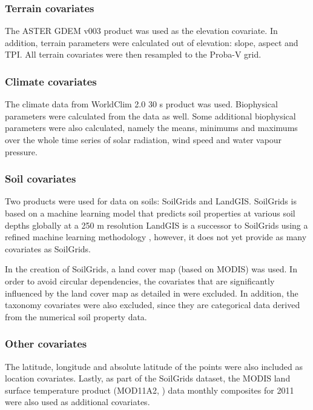 \documentclass[a4paper,10pt]{article}
\begin{document}
\subsubsection{Terrain covariates}

The ASTER GDEM v003 \citep{ASTGTM003} product was used as the elevation covariate.
In addition, terrain parameters were calculated out of elevation: slope, aspect and \ac{TPI}.
All terrain covariates were then resampled to the Proba-V grid.

\subsubsection{Climate covariates}

The climate data from WorldClim 2.0 30 s product \citep{worldclim2} was used.
Biophysical parameters were calculated from the data as well.
Some additional biophysical parameters were also calculated, namely the means, minimums and maximums over the whole time series of solar radiation, wind speed and water vapour pressure.

\subsubsection{Soil covariates}

Two products were used for data on soils: SoilGrids and LandGIS.
SoilGrids is based on a machine learning model that predicts soil properties at various soil depths globally at a 250 m resolution \citep{hengl_soilgrids250m_2017}
LandGIS is a successor to SoilGrids using a refined machine learning methodology \citep{hengl_predictive_2019}, however, it does not yet provide as many covariates as SoilGrids.

In the creation of SoilGrids, a land cover map (based on MODIS) was used.
In order to avoid circular dependencies, the covariates that are significantly influenced by the land cover map as detailed in \citet{hengl_soilgrids250m_2017} were excluded.
In addition, the taxonomy covariates were also excluded, since they are categorical data derived from the numerical soil property data.

\subsubsection{Other covariates}

The latitude, longitude and absolute latitude of the points were also included as location covariates.
Lastly, as part of the SoilGrids dataset, the MODIS land surface temperature product (MOD11A2, \citealp{wan_mod11a2_2015}) data monthly composites for 2011 were also used as additional covariates.
\end{document}
